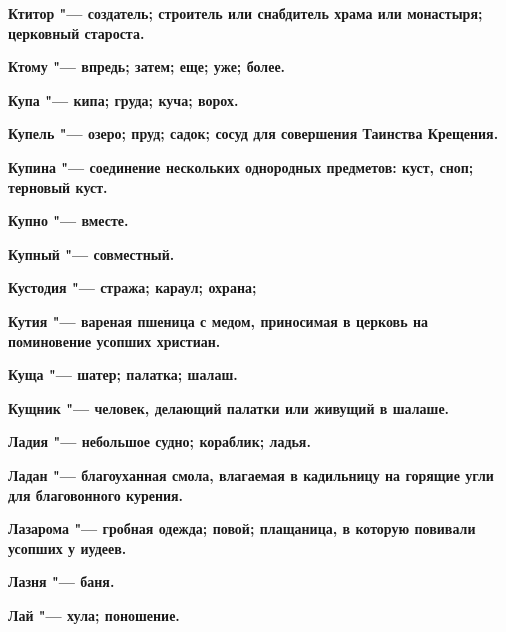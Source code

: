 \bfseries Ктитор \normalfont{} "--- создатель; строитель или снабдитель храма или монастыря; церковный староста. 




\bfseries Ктому \normalfont{} "--- впредь; затем; еще; уже; более. 




\bfseries Купа \normalfont{} "--- кипа; груда; куча; ворох. 




\bfseries Купель \normalfont{} "--- озеро; пруд; садок; сосуд для совершения Таинства Крещения. 




\bfseries Купина \normalfont{} "--- соединение нескольких однородных предметов: куст, сноп; терновый куст. 




\bfseries Купно \normalfont{} "--- вместе. 




\bfseries Купный \normalfont{} "--- совместный. 




\bfseries Кустодия \normalfont{} "--- стража; караул; охрана; 




\bfseries Кутия \normalfont{} "--- вареная пшеница с медом, приносимая в церковь на поминовение усопших христиан. 




\bfseries Куща \normalfont{} "--- шатер; палатка; шалаш. 




\bfseries Кущник \normalfont{} "--- человек, делающий палатки или живущий в шалаше. 




 





\bfseries Ладия \normalfont{} "--- небольшое судно; кораблик; ладья. 




\bfseries Ладан \normalfont{} "--- благоуханная смола, влагаемая в кадильницу на горящие угли для благовонного курения. 




\bfseries Лазарома \normalfont{} "--- гробная одежда; повой; плащаница, в которую повивали усопших у иудеев. 




\bfseries Лазня \normalfont{} "--- баня. 




\bfseries Лай \normalfont{} "--- хула; поношение. 




